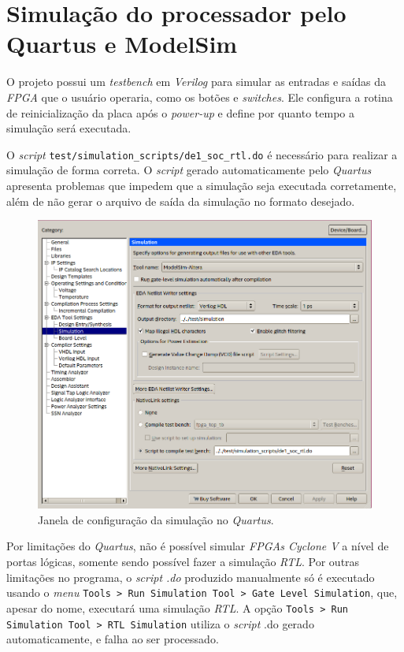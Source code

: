 \section{Simulação do processador pelo Quartus e ModelSim}
    { O projeto possui um \textit{testbench} em \textit{Verilog} para simular as
        entradas e saídas da \textit{FPGA} que o usuário operaria, como os botões
        e \textit{switches}. Ele configura a rotina de reinicialização da placa
        após o \textit{power-up} e define por quanto tempo a simulação será
        executada.
    }

    { O \textit{script} \texttt{test/simulation\_scripts/de1\_soc\_rtl.do} é
        necessário para realizar a simulação de forma correta. O \textit{script}
        gerado automaticamente pelo \textit{Quartus} apresenta problemas que
        impedem que a simulação seja executada corretamente, além de não gerar
        o arquivo de saída da simulação no formato desejado.
    }
    \begin{figure}[H]
    \centering
        \includegraphics[width=.6\linewidth]{../images/quartus/simulation_config.png}
        \caption{Janela de configuração da simulação no \textit{Quartus}.}
        \label{fig:quartus_simulation_config}
    \end{figure}

    { Por limitações do \textit{Quartus}, não é possível simular
        \textit{FPGAs Cyclone V} a nível de portas lógicas, somente sendo possível
        fazer a simulação \textit{RTL}. Por outras limitações no programa, o
        \textit{script .do} produzido manualmente só é executado usando o
        \textit{menu} \texttt{Tools > Run Simulation Tool > Gate Level Simulation},
        que, apesar do nome, executará uma simulação \textit{RTL}. A opção
        \texttt{Tools > Run Simulation Tool > RTL Simulation} utiliza o \textit{script}
        .do gerado automaticamente, e falha ao ser processado.
    }

